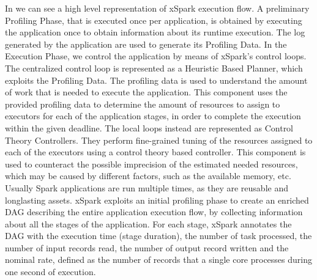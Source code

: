 In  we can see a high level representation of xSpark execution flow. A preliminary Profiling Phase, that is executed once per application,
is obtained by executing the application once to obtain information
about its runtime execution. The log generated by the application are used to generate its Profiling Data.
In the Execution Phase, we control the application by means of xSpark’s control loops. 
The centralized control loop is represented as a Heuristic Based Planner, which exploits the Profiling Data. The profiling data is used to understand the amount of
work that is needed to execute the application. This component uses the provided profiling data to determine the amount of resources to assign to executors for each of the application stages, in order to complete the execution within the given deadline. The
local loops instead are represented as Control Theory Controllers. They
perform fine-grained tuning of the resources assigned to each of the
executors using a control theory based controller. This component is
used to counteract the possible imprecision of the estimated needed
resources, which may be caused by different factors, such as the available
memory, etc.
Usually Spark applications are run multiple times, as they are reusable and longlasting assets. xSpark exploits an initial profiling phase to create an enriched DAG describing the entire application execution flow, by collecting information about all the stages of the application. For each stage, xSpark annotates the DAG with the execution time (stage duration), the number of task processed, the number of input records read, the number of
output record written and the nominal rate, defined as the number of
records that a single core processes during one second of execution. 

%

